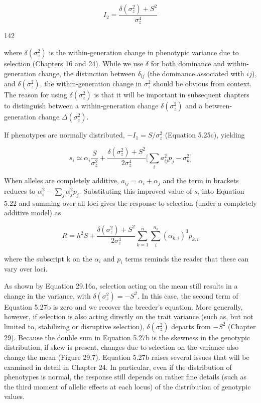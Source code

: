 \documentclass{article}
\begin{document}
\begin{equation}
I_{2}=\frac{\delta(\sigma_{z}^{2})+S^{2}}{\sigma_{z}^{4}}
\tag{5.26b}
\label{eq:5_26b}
\end{equation}

142

where  $ \delta(\sigma_{z}^{2}) $ is the within-generation change in phenotypic variance due to selection (Chapters 16 and 24). While we use  $ \delta $ for both dominance and within-generation change, the distinction between  $ \delta_{ij} $ (the dominance associated with  $ ij $), and  $ \delta(\sigma_{z}^{2}) $, the within-generation change in  $ \sigma_{z}^{2} $ should be obvious from context. The reason for using  $ \delta(\sigma_{z}^{2}) $ is that it will be important in subsequent chapters to distinguish between a within-generation change  $ \delta(\sigma_{z}^{2}) $ and a between-generation change  $ \Delta(\sigma_{z}^{2}) $.

If phenotypes are normally distributed,  $ -I_1 = S/\sigma_z^2 $ (Equation 5.25c), yielding

\begin{equation}
s_{i}\simeq\alpha_{i}\frac{S}{\sigma_{z}^{2}}+\frac{\delta(\sigma_{z}^{2})+S^{2}}{2\sigma_{z}^{4}}\biggl[\sum_{i}a_{i j}^{2}p_{j}-\sigma_{k}^{2}\biggr]
\tag{5.27a}
\label{eq:5_27a}
\end{equation}

When alleles are completely additive,  $ a_{ij} = \alpha_i + \alpha_j $ and the term in brackets reduces to  $ \alpha_i^2 - \sum_j \alpha_j^2 p_j $. Substituting this improved value of  $ s_i $ into Equation 5.22 and summing over all loci gives the response to selection (under a completely additive model) as

\begin{equation}
R=h^{2}S+\frac{\delta(\sigma_{z}^{2})+S^{2}}{2\sigma_{z}^{4}}\sum_{k=1}^{n}\sum_{i}^{n_{k}}(\alpha_{k,i})^{3}p_{k,i}
\tag{5.27b}
\label{eq:5_27b}
\end{equation}

where the subscript k on the  $ \alpha_{i} $ and  $ p_{i} $ terms reminds the reader that these can vary over loci.

As shown by Equation 29.16a, selection acting on the mean still results in a change in the variance, with  $ \delta(\sigma_z^2) = -S^2 $. In this case, the second term of Equation 5.27b is zero and we recover the breeder's equation. More generally, however, if selection is also acting directly on the trait variance (such as, but not limited to, stabilizing or disruptive selection),  $ \delta(\sigma_z^2) $ departs from  $ -S^2 $ (Chapter 29). Because the double sum in Equation 5.27b is the skewness in the genotypic distribution, if skew is present, changes due to selection on the variance also change the mean (Figure 29.7). Equation 5.27b raises several issues that will be examined in detail in Chapter 24. In particular, even if the distribution of phenotypes is normal, the response still depends on rather fine details (such as the third moment of allelic effects at each locus) of the distribution of genotypic values.
\end{document}
